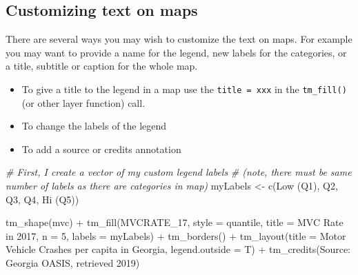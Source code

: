 \documentclass[
]{book}
\newenvironment{Shaded}{\begin{snugshade}}{\end{snugshade}}
\newcommand{\AttributeTok}[1]{\textcolor[rgb]{0.77,0.63,0.00}{#1}}
\newcommand{\CommentTok}[1]{\textcolor[rgb]{0.56,0.35,0.01}{\textit{#1}}}
\newcommand{\DecValTok}[1]{\textcolor[rgb]{0.00,0.00,0.81}{#1}}
\newcommand{\FunctionTok}[1]{\textcolor[rgb]{0.00,0.00,0.00}{#1}}
\newcommand{\NormalTok}[1]{#1}
\newcommand{\OtherTok}[1]{\textcolor[rgb]{0.56,0.35,0.01}{#1}}
\newcommand{\SpecialCharTok}[1]{\textcolor[rgb]{0.00,0.00,0.00}{#1}}
\newcommand{\StringTok}[1]{\textcolor[rgb]{0.31,0.60,0.02}{#1}}
\providecommand{\tightlist}{%
  \setlength{\itemsep}{0pt}\setlength{\parskip}{0pt}}
\begin{document}
\hypertarget{customizing-text-on-maps}{%
\subsection{Customizing text on maps}\label{customizing-text-on-maps}}

There are several ways you may wish to customize the text on maps. For example you may want to provide a name for the legend, new labels for the categories, or a title, subtitle or caption for the whole map.

\begin{itemize}
\tightlist
\item
  To give a title to the legend in a map use the \texttt{title\ =\ \textquotesingle{}xxx\textquotesingle{}} in the \texttt{tm\_fill()} (or other layer function) call.
\item
  To change the labels of the legend
\item
  To add a source or credits annotation
\end{itemize}

\begin{Shaded}
\begin{Highlighting}[]
  \CommentTok{\# First, I create a vector of my custom legend labels}
  \CommentTok{\# (note, there must be same number of labels as there are categories in map)}
\NormalTok{myLabels }\OtherTok{\textless{}{-}} \FunctionTok{c}\NormalTok{(}\StringTok{\textquotesingle{}Low (Q1)\textquotesingle{}}\NormalTok{, }\StringTok{\textquotesingle{}Q2\textquotesingle{}}\NormalTok{, }\StringTok{\textquotesingle{}Q3\textquotesingle{}}\NormalTok{, }\StringTok{\textquotesingle{}Q4\textquotesingle{}}\NormalTok{, }\StringTok{\textquotesingle{}Hi (Q5)\textquotesingle{}}\NormalTok{)}

\FunctionTok{tm\_shape}\NormalTok{(mvc) }\SpecialCharTok{+}
  \FunctionTok{tm\_fill}\NormalTok{(}\StringTok{\textquotesingle{}MVCRATE\_17\textquotesingle{}}\NormalTok{,}
          \AttributeTok{style =} \StringTok{\textquotesingle{}quantile\textquotesingle{}}\NormalTok{,}
          \AttributeTok{title =} \StringTok{\textquotesingle{}MVC Rate in 2017\textquotesingle{}}\NormalTok{,}
          \AttributeTok{n =} \DecValTok{5}\NormalTok{, }
          \AttributeTok{labels =}\NormalTok{ myLabels) }\SpecialCharTok{+}
  \FunctionTok{tm\_borders}\NormalTok{() }\SpecialCharTok{+}
\FunctionTok{tm\_layout}\NormalTok{(}\AttributeTok{title =} \StringTok{\textquotesingle{}Motor Vehicle Crashes per capita in Georgia\textquotesingle{}}\NormalTok{,}
          \AttributeTok{legend.outside =}\NormalTok{ T) }\SpecialCharTok{+}
\FunctionTok{tm\_credits}\NormalTok{(}\StringTok{\textquotesingle{}Source: Georgia OASIS, retrieved 2019\textquotesingle{}}\NormalTok{)}
\end{Highlighting}
\end{Shaded}
\end{document}
